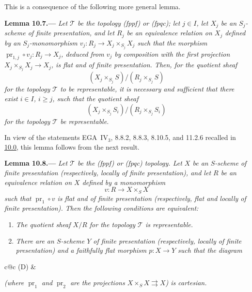 This is a consequence of the following more general lemma.

\medskip
{}\label{lem:sga3-VIB-10.7}%
\noindent\textbf{Lemma 10.7.---}
\emph{Let \(\mathcal T\) be the topology \textup{(fppf)} or
\textup{(fpqc)}; let \(j\in I\), let \(X_j\) be an
\(S_j\)-scheme of finite presentation, and let \(R_j\) be an
equivalence relation on \(X_j\) defined by an
\(S_j\)-monomorphism \(v_j:R_j\to X_j\times_{S_j}X_j\) such that
the morphism \(\operatorname{pr}_{1,j}\circ v_j:R_j\to X_j\),
deduced from \(v_j\) by composition with the first projection
\(X_j\times_{S_j}X_j\to X_j\), is flat and of finite
presentation. Then, for the quotient sheaf}
\[
  (X_j\times_{S_j}S)/(R_j\times_{S_j}S)
\]
\emph{for the topology \(\mathcal T\) to be representable, it is
necessary and sufficient that there exist \(i\in I\),
\(i\geq j\), such that the quotient sheaf}
\[
  (X_j\times_{S_j}S_i)/(R_j\times_{S_j}S_i)
\]
\emph{for the topology \(\mathcal T\) be representable.}

In view of the statements EGA~IV\(_3\), 8.8.2, 8.8.3,
8.10.5, and 11.2.6 recalled in
\hyperref[par:sga3-VIB-10.0]{10.0}, this lemma follows from
the next result.

\medskip
{}\label{lem:sga3-VIB-10.8}%
\noindent\textbf{Lemma 10.8.---}
\emph{Let \(\mathcal T\) be the \textup{(fppf)} or
\textup{(fpqc)} topology. Let \(X\) be an \(S\)-scheme of
finite presentation \textup{(respectively, locally of finite
presentation)}, and let \(R\) be an equivalence relation on
\(X\) defined by a monomorphism}
\[
  v:R\longrightarrow X\times_S X
\]
\emph{such that \(\operatorname{pr}_1\circ v\) is flat and of
finite presentation \textup{(respectively, flat and locally
of finite presentation)}. Then the following conditions are
equivalent:}
\begin{enumerate}
\item[\textup{(i)}]\label{concl:sga3-VIB-10.8-i}
  \emph{The quotient sheaf \(X/R\) for the topology
  \(\mathcal T\) is representable.}

\item[\textup{(ii)}]\label{concl:sga3-VIB-10.8-ii}
  \emph{There are an \(S\)-scheme \(Y\) of finite presentation
  \textup{(respectively, locally of finite presentation)} and
  a faithfully flat morphism \(p:X\to Y\) such that the
  diagram}
\end{enumerate}
\begin{center}
  \label{diag:sga3-VIB-10.8-D}%
  \begin{tabular}{c@{\qquad}c}
    \textup{(D)} &
  \end{tabular}
\end{center}
\emph{\textup{(}where \(\operatorname{pr}_1\) and
\(\operatorname{pr}_2\) are the projections
\(X\times_SX\rightrightarrows X\)\textup{)} is cartesian.}

